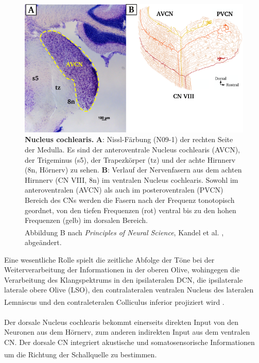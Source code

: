 \documentclass[12pt,a4paper,pdftex]{article}
\begin{document}
\begin{figure}[H]
    \centering
    \includegraphics[width = \textwidth]{pictures/auditory/CN.png}
    \caption[Nucleus cochlearis]{\textbf{Nucleus cochlearis.} \textbf{A}: Nissl-Färbung (N09-1) der rechten Seite der Medulla. Es sind der anteroventrale Nucleus cochlearis (AVCN), der Trigeminus (s5), der Trapezkörper (tz) und der achte Hirnnerv (8n, Hörnerv) zu sehen. \textbf{B}: Verlauf der Nervenfasern aus dem achten Hirnnerv (CN VIII, 8n) im ventralen Nucleus cochlearis. Sowohl im anteroventralen (AVCN) als auch im posteroventralen (PVCN) Bereich des CNs werden die Fasern nach der Frequenz tonotopisch geordnet, von den tiefen Frequenzen (rot) ventral bis zu den hohen Frequenzen (gelb) im dorsalen Bereich. \\
    Abbildung B nach \textit{Principles of Neural Science}, Kandel et al. \textsuperscript{\cite[31]{kandel2013principles}}, abgeändert.}
    \label{fig:Nucleus_cochlearis}
\end{figure}

\newpage
Eine wesentliche Rolle spielt die zeitliche Abfolge der Töne bei der Weiterverarbeitung der Informationen in der oberen Olive, wohingegen die Verarbeitung des Klangspektrums in den ipsilateralen DCN, die ipsilaterale laterale obere Olive (LSO), den contralateralen ventralen Nucleus des lateralen Lemniscus und den contraleteralen Colliculus inferior projiziert wird \textsuperscript{\cite[31]{kandel2013principles}}. 
\\\\
\noindent Der dorsale Nucleus cochlearis bekommt einerseits direkten Input von den Neuronen aus dem Hörnerv, zum anderen indirekten Input aus dem ventralen CN. Der dorsale CN integriert akustische und somatosensorische Informationen um die Richtung der Schallquelle zu bestimmen\textsuperscript{\cite[31]{kandel2013principles}}. 
\end{document}
